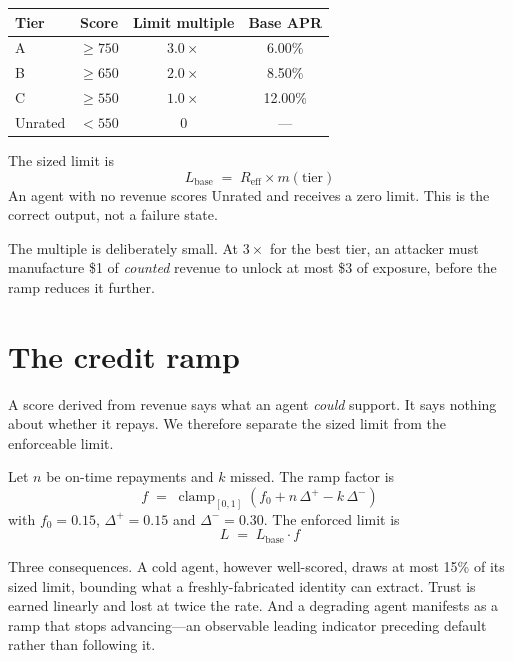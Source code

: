 \documentclass[11pt,a4paper]{article}
\DeclareMathOperator{\clampop}{clamp}
\newcommand{\clamp}[1]{\clampop_{[0,1]}\!\left(#1\right)}
\begin{document}
\begin{center}
\begin{tabular}{@{}lccc@{}}
\toprule
\textbf{Tier} & \textbf{Score} & \textbf{Limit multiple} & \textbf{Base APR} \\
\midrule
A       & $\geq 750$ & $3.0\times$ & 6.00\% \\
B       & $\geq 650$ & $2.0\times$ & 8.50\% \\
C       & $\geq 550$ & $1.0\times$ & 12.00\% \\
Unrated & $< 550$    & $0$         & --- \\
\bottomrule
\end{tabular}
\end{center}

The sized limit is
\begin{equation}
L_{\mathrm{base}} \;=\; R_{\mathrm{eff}} \times m(\mathrm{tier})
\end{equation}
An agent with no revenue scores Unrated and receives a zero limit. This is the
correct output, not a failure state.

The multiple is deliberately small. At $3\times$ for the best tier, an attacker
must manufacture \$1 of \emph{counted} revenue to unlock at most \$3 of exposure,
before the ramp reduces it further.

\section{The credit ramp}
\label{sec:ramp}

A score derived from revenue says what an agent \emph{could} support. It says
nothing about whether it repays. We therefore separate the sized limit from the
enforceable limit.

Let $n$ be on-time repayments and $k$ missed. The ramp factor is
\begin{equation}
f \;=\; \clamp{f_0 + n\,\Delta^{+} - k\,\Delta^{-}}
\end{equation}
with $f_0 = 0.15$, $\Delta^{+} = 0.15$ and $\Delta^{-} = 0.30$. The enforced
limit is
\begin{equation}
L \;=\; L_{\mathrm{base}} \cdot f
\end{equation}

Three consequences. A cold agent, however well-scored, draws at most 15\% of its
sized limit, bounding what a freshly-fabricated identity can extract. Trust is
earned linearly and lost at twice the rate. And a degrading agent manifests as a
ramp that stops advancing---an observable leading indicator preceding default
rather than following it.
\end{document}
